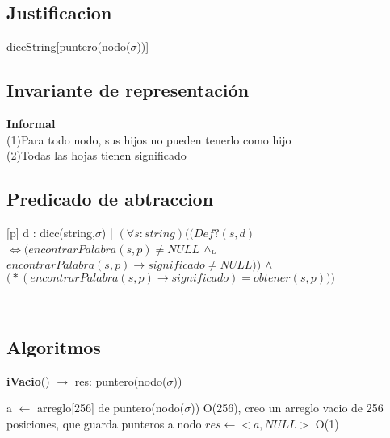 \begin{Representacion}
\subsection{Justificacion}
	\begin{Estructura}{diccString}[puntero(nodo($\sigma$))]
		\begin{Tupla}[nodo]
		\end{Tupla}
	\end{Estructura}
\subsection{Invariante de representación}

\textbf{Informal}\\
(1)Para todo nodo, sus hijos no pueden tenerlo como hijo\\
(2)Todas las hojas tienen significado\\

\subsection{Predicado de abtraccion}

[p]{ d : dicc(string,$\sigma$) | $(\forall s:string)\Big( \big(Def?(s,d)$ $\Longleftrightarrow (encontrarPalabra(s,p) \neq NULL$ $\land_{\mathrm{\scriptscriptstyle{L}}}$ $encontrarPalabra(s,p)\to significado \neq NULL)\big)$ $\land$ $\big(*(encontrarPalabra(s,p)\to significado) = obtener(s,p)\big)\Big)$}


~  

\subsection{Algoritmos}

\begin{Algoritmos}

\begin{algorithm}[H]{\textbf{iVacio}() $\to$ res: puntero(nodo($\sigma$))}
	\begin{algorithmic}[1]
		\State a $\gets$ arreglo[256] de puntero(nodo($\sigma$)) \Comment O(256), creo un arreglo vacio de 256 posiciones, que guarda punteros a nodo
		\State $res \gets <a, NULL>$ \Comment O(1)
		

\end{algorithmic}
\end{algorithm}
\end{Algoritmos}
\end{Representacion}
